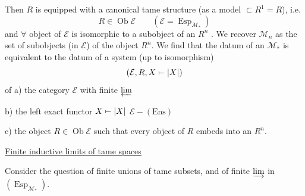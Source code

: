 Then $R$ is equipped with a canonical tame structure (as a model $\subset R^1=R$), i.e.
\[
 R\in\operatorname{Ob}\mathcal E\qquad(\mathcal E=\operatorname{Esp}_{\mathcal M_*})
\]
and $\forall$ object of $\mathcal E$ is isomorphic to a subobject of an $R^n$ . We recover $\mathcal M_n$ as the set of  subobjects (in $\mathcal E$) of the object $R^n$. We find that the datum of an $\mathcal M_*$ is equivalent to the datum of a system (up to isomorphism)
\[
 (\mathcal E,R,X\mathrel{\mapstochar\relbar}|X|)
\]
of a) the category $\mathcal E$ with finite $\varprojlim$

b) the left exact functor $X\mathrel{\mapstochar\relbar}|X|$ $\mathcal E\mathbin{-}(\mathrm{Ens})$

c) the object $R\in\operatorname{Ob}\mathcal E$ such that every object of $R$ embeds into an $R^n$.



\uline{Finite inductive limits of tame spaces}

Consider the question of finite unions of tame subsets, and of finite $\varinjlim$ in $(\operatorname{Esp}_{\mathcal M_*})$.

